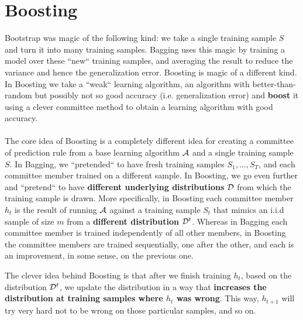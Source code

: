 \section{Boosting}
Bootstrap was magic of the following kind: we take a single training sample $S$ and turn it into many training samples. Bagging uses this magic by training a model over these ``new`` training samples, and averaging the result to reduce the variance and hence the generalization error. Boosting is magic of a different kind. In Boosting we take a ``weak`` learning algorithm, an algorithm with better-than-random but possibly not so good accuracy (i.e. generalization error) and \textbf{boost} it using a clever committee method to obtain a learning algorithm with good accuracy. 
\\~\\
The core idea of Boosting is a completely different idea for creating a committee of prediction rule from a base learning algorithm $\mathcal{A}$ and a single training sample $S$. In Bagging, we ``pretended`` to have fresh training samples $S_1,\ldots,S_T$, and each committee member trained on a different sample. In Boosting, we go even further and ``pretend`` to have \textbf{different underlying distributions} $\mathcal{D}$ from which the training sample is drawn. More specifically, in Boosting each committee member $h_t$ is the result of running $\mathcal{A}$ against a training sample $S_t$ that mimics an i.i.d sample of size $m$ from a \textbf{different distribution} $\mathcal{D}^t$. Whereas in Bagging each committee member is trained independently of all other members, in Boosting the committee members are trained sequentially, one after the other, and each is an improvement, in some sense, on the previous one. 

The clever idea behind Boosting is that after we finish training $h_t$, based on the distribution $\mathcal{D}^t$, we update the distribution in a way that \textbf{increases the distribution at training samples where $h_t$ was wrong}. This way, $h_{t+1}$ will try very hard not to be wrong on those particular samples, and so on. 


